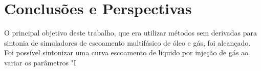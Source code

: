 \chapter{Conclusões e Perspectivas}
%
O principal objetivo deste trabalho, que era utilizar métodos sem derivadas para sintonia de simuladores de escoamento multifásico de óleo e gás, foi alcançado.
%
Foi possível sintonizar uma curva escoamento de líquido por injeção de gás ao variar os parâmetros "I